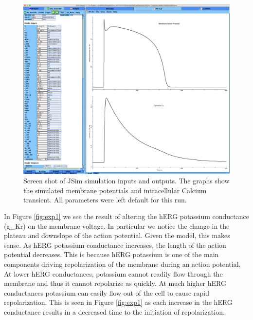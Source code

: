 \documentclass[11pt]{article}
\begin{document}
\begin{figure}[H]
	\centering
	\centering
	\includegraphics[width = .95\textwidth]{figs/original.png}
	
	\caption{Screen shot of JSim simulation inputs and outputs. The graphs show the simulated membrane potentials and intracellular Calcium transient. All parameters were left default for this run. }
	\label{fig:original}
\end{figure}
\par{}

In Figure \ref{fig:exp1} we see the result of altering the hERG potassium conductance (g\_Kr) on the membrane voltage. In particular we notice the change in the plateau and downslope of the action potential. Given the model, this makes sense. As hERG potassium conductance increases, the length of the action potential decreases. This is because hERG potassium is one of the main components driving repolarization of the membrane during an action potential. At lower hERG conductances, potassium cannot readily flow through the membrane and thus it cannot repolarize as quickly. At much higher hERG conductances potassium can easily flow out of the cell to cause rapid repolarization. This is seen in Figure \ref{fig:exp1} as each increase in the hERG conductance results in a decreased time to the initiation of repolarization.
\end{document}
